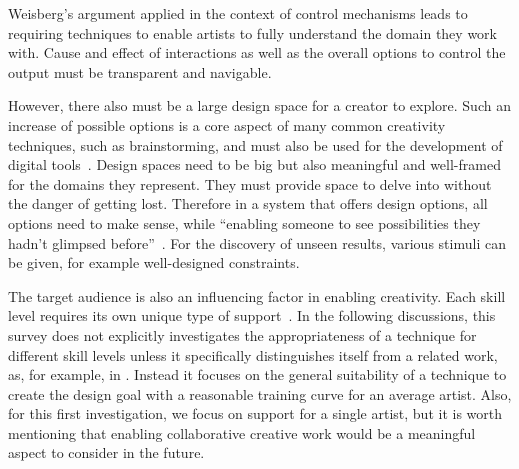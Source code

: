 Weisberg's argument applied in the context of control mechanisms leads to requiring techniques to enable artists to fully understand the domain they work with. Cause and effect of interactions as well as the overall options to control the output must be transparent and navigable.

However, there also must be a large design space for a creator to explore. 
Such an increase of possible options is a core aspect of many common creativity techniques, such as brainstorming, and must also be used for the development of digital tools~\cite{terry_2004_vea}. Design spaces need to be big but also meaningful and well-framed for the domains they represent. They must provide space to delve into without the danger of getting lost. 
Therefore in a system that offers design options, all options need to make sense, while ``enabling someone to see possibilities they hadn't glimpsed before''~\cite{boden_2010_cat}. For the discovery of unseen results, various stimuli can be given, for example well-designed constraints. 


The target audience is also an influencing factor in enabling creativity. Each skill level requires its own unique type of support~\cite{cherry_2014_qcs}. 
In the following discussions, this survey does not explicitly investigates the appropriateness of a technique for different skill levels unless it specifically distinguishes itself from a related work, as, for example, in \cite{benedetti_2014_pba}. Instead it focuses on the general suitability of a technique to create the design goal with a reasonable training curve for an average artist. Also, for this first investigation, we focus on support for a single artist, but it is worth mentioning that enabling collaborative creative work would be a meaningful aspect to consider in the future.

